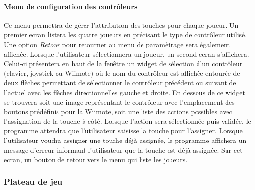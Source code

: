 \paragraph{Menu de configuration des contrôleurs}

Ce menu permettra de gérer l'attribution des touches pour chaque joueur. Un premier ecran listera les quatre joueurs en précisant le type de contrôleur utilisé. Une option \emph{Retour} pour retourner au menu de paramètrage sera également affichée. Lorsque l'utilisateur sélectionnera un joueur, un second ecran s'affichera. Celui-ci présentera en haut de la fenêtre un widget de sélection d'un contrôleur (clavier, joystick ou Wiimote) où le nom du contrôleur est affichée entourée de deux flèches permettant de sélectionner le contrôleur précédent ou suivant de l'actuel avec les flèches directionnelles gauche et droite. En dessous de ce widget se trouvera soit une image représentant le contrôleur avec l'emplacement des boutons prédéfinis pour la Wiimote, soit une liste des actions possibles avec l'assignation de la touche à côté. Lorsque l'action sera sélectionnée puis validée, le programme attendra que l'utilisateur saisisse la touche pour l'assigner. Lorsque l'utilisateur voudra assigner une touche déjà assignée, le programme affichera un message d'erreur informant l'utilisateur que la touche est déjà assignée. Sur cet ecran, un bouton de retour vers le menu qui liste les joueurs.



\subsubsection{Plateau de jeu}

